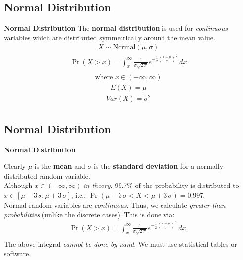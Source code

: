 \documentclass[compress]{beamer}        %
\makeatletter
\newcommand{\tcb}{\textcolor{beamer@blendedblue}}
\makeatother
\begin{document}
\subsection{Normal Distribution}
\begin{frame}{\bf \tcb{Normal Distribution}}
The {\bf normal distribution} is used for \emph{continuous} variables which are distributed symmetrically around the mean value.
\begin{align*}
\boxed{X \sim \text{Normal}(\mu, \sigma)}
\end{align*}
\begin{align*}
\boxed{\Pr(X > x) = \int_x^\infty \frac{1}{\sigma \sqrt{2\,\pi}} e^{-\frac{1}{2}\left(\frac{x-\mu}{\sigma}\right)^2}\,dx}\\[-1cm]
\end{align*}
\begin{align*}
\text{where } \boxed{x \in (-\infty,\infty)}
\end{align*}
\begin{align*}
\boxed{E(X) = \mu}
\end{align*}
\begin{align*}
\boxed{Var(X) = \sigma^2}\\[-0.5cm]
\end{align*}

\end{frame}


\subsection{Normal Distribution}
\begin{frame}{\bf \tcb{Normal Distribution}}

Clearly $\mu$ is the {\bf mean} and $\sigma$ is the {\bf standard deviation} for a normally distributed random variable.\\[0.7cm]

Although $x \in (-\infty, \infty)$ \emph{in theory}, 99.7\% of the probability is distributed to $x \in [\mu - 3\,\sigma,\mu + 3\,\sigma]$, i.e., $\Pr(\mu - 3\,\sigma < X < \mu + 3\,\sigma) = 0.997.$\\[0.7cm]

Normal random variables are \emph{continuous}. Thus, we calculate \emph{greater than probabilities} (unlike the discrete cases). This is done via:\\[-0.3cm]
\begin{align*}
\Pr(X > x) = \int_x^\infty \frac{1}{\sigma \sqrt{2\,\pi}} e^{-\frac{1}{2}\left(\frac{x-\mu}{\sigma}\right)^2}\,dx.\\[-0.4cm]
\end{align*}
The above integral \emph{cannot be done by hand}. We must use statistical tables or software.


\end{frame}
\end{document}

